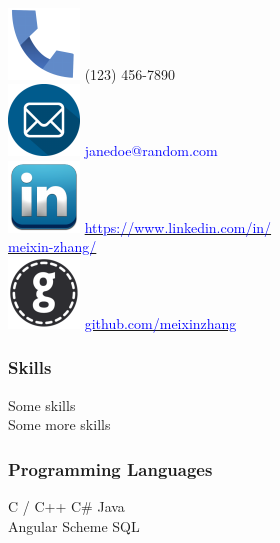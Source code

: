 \documentclass{mxresume}
\newcommand{\Bullet}{\tiny\textbf{ }\Large\textperiodcentered\tiny\textbf{ }\textbf{ }\normalsize}
\begin{document}
\begin{resumeheading} %
\vspace{2mm}
\end{resumeheading}
\vspace{-3mm}
\begin{minipage}[t]{0.1\textwidth}
\end{minipage}
\hfill
\begin{minipage}[t]{0.25\textwidth} %
\ \\[2mm]
\includegraphics[scale=0.15]{phone-icon.png}
(123) 456-7890 \\
\includegraphics[scale=0.15]{email-icon.png}
\textcolor{blue}{janedoe@random.com}
\\
\includegraphics[scale=0.15]{linkedin-icon.png}
\href{www.linkedin.com/in/meixin-zhang/}
{\textcolor{blue}{https://www.linkedin.com/in/ \\
\hspace*{4mm} meixin-zhang/}}
\\
\includegraphics[scale=0.15]{github-icon.png}
\href{https://github.com/meixinzhang}
{\textcolor{blue}{github.com/meixinzhang}}
\subsubsection*{Skills}
Some skills \\
Some more skills
\subsubsection*{Programming Languages}
C / C++ \Bullet C\# \Bullet Java \\
Angular \Bullet Scheme \Bullet SQL

\end{minipage}
\end{document}
